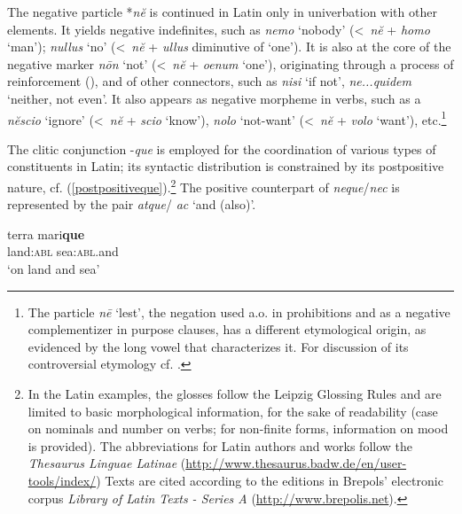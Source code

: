 \documentclass[output=paper,modfonts,nonflat,citecolor=brown,
showindex
]{langsci/langscibook}
\begin{document}
The negative particle *{\emph{n\u{e}}} is continued in Latin only in univerbation with other elements. It yields negative indefinites, such as {\emph{nemo}} `nobody' (\textless \ {\emph{n\u{e}}} + {\emph{homo}} `man'); {\emph{nullus}} `no' (\textless \ {\emph{n\u{e}}} + {\emph{ullus}} diminutive of `one'). It is also at the core of the negative marker {\emph{n\=on}} `not' (\textless \ {\emph{n\u{e}}} + {\emph{oenum}} `one'), originating through a process of reinforcement (\citealt[]{Fruyt08a, Gianollo18}), and of other connectors, such as {\emph{nisi}} `if not', {\emph{ne...quidem}} `neither, not even'. It also appears as negative morpheme in verbs, such as a {\emph{n\u{e}scio}} `ignore' (\textless \ {\emph{n\u{e}}} + {\emph{scio}} `know'), {\emph{nolo}} `not-want' (\textless \ {\emph{n\u{e}}} + {\emph{volo}} `want'), etc.{\footnote{The particle {\emph{n\=e}} `lest', the negation used a.o. in prohibitions and as a negative complementizer in purpose clauses, has a different etymological origin, as evidenced by the long vowel that characterizes it. For discussion of its controversial etymology cf. \citet{deVaan}.}}

The clitic conjunction -{\emph{que}} is employed for the coordination of various types of constituents in Latin; its syntactic distribution is constrained by its postpositive nature, cf. (\ref{postpositiveque}).{\footnote{In the Latin examples, the glosses follow the Leipzig Glossing Rules and are limited to basic morphological information, for the sake of readability (case on nominals and number on verbs; for non-finite forms, information on mood is provided). The abbreviations for Latin authors and works follow the {\emph{Thesaurus Linguae Latinae}} (\url{http://www.thesaurus.badw.de/en/user-tools/index/}) Texts are cited according to the editions in Brepols' electronic corpus {\emph{Library of Latin Texts - Series A}} (\url{http://www.brepolis.net}).}} The positive counterpart of {\emph{neque}}\slash{\emph{nec}} is represented by the pair {\emph{atque}}/ {\emph{ac}} `and (also)'.

{\begin{exe}
\ex \label{postpositiveque} \gll terra mari{\textbf{que}}\\ 
\linebreak land:{\textsc{abl}} sea:{\textsc{abl}}.and\\
\linebreak \hfill `on land and sea'\\
\end{exe}}
\end{document}
